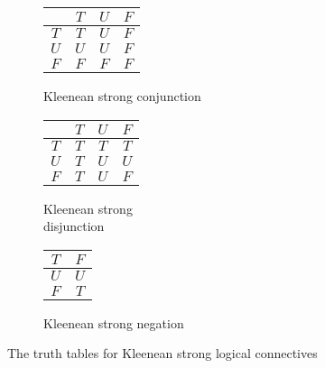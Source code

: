 \documentclass[12pt]{article}
\begin{document}
\begin{figure}[h!]
    \centering
    \begin{subfigure}{0.3\textwidth}
        \centering
            \begin{tabular}{ c | c | c | c }
                & $T$ & $U$ & $F$ \\
                \hline
                $T$ & $T$ & $U$ & $F$ \\
                \hline
                $U$ & $U$ & $U$ & $F$ \\
                \hline
                $F$ & $F$ & $F$ & $F$ \\
            \end{tabular}
            \caption{Kleenean strong conjunction}
            \label{KleeneStrongAnd}
    \end{subfigure}
    \begin{subfigure}{0.3\textwidth}
        \centering
            \begin{tabular}{ c | c | c | c }
                & $T$ & $U$ & $F$ \\
                \hline
                $T$ & $T$ & $T$ & $T$ \\
                \hline
                $U$ & $T$ & $U$ & $U$ \\
                \hline
                $F$ & $T$ & $U$ & $F$ \\
            \end{tabular}
            \caption{Kleenean strong \\ disjunction}
            \label{KleeneStrongOr}
    \end{subfigure}
    \begin{subfigure}{0.3\textwidth}
        \centering
            \begin{tabular}{ c | c }
                $T$ & $F$ \\
                \hline
                $U$ & $U$ \\
                \hline
                $F$ & $T$ \\
            \end{tabular}
            \caption{Kleenean strong negation}
            \label{KleeneStrongNot}
    \end{subfigure}
    \caption{The truth tables for Kleenean strong logical connectives}
\end{figure}
\end{document}
